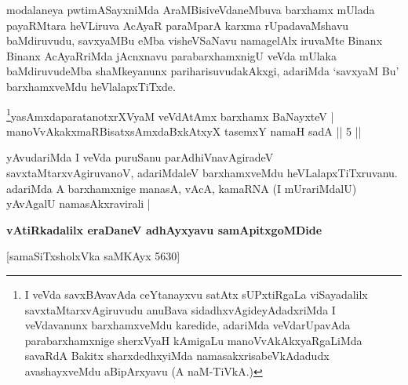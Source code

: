 \begin{artha}
modalaneya pwtimASayxniMda AraMBisiveVdaneMbuva barxhamx mUlada
 payaRMtara heVLiruva AcAyaR paraMparA karxma rUpadavaMshavu
baMdiruvudu, savxyaMBu eMba visheVSaNavu namagelAlx iruvaMte Binanx
Binanx AcAyaRriMda jAcnxnavu parabarxhamxnigU veVda mUlaka
baMdiruvudeMba shaMkeyanunx pariharisuvudakAkxgi, adariMda `savxyaM Bu'
barxhamxveMdu heVlalapxTiTxde.
\end{artha}

\begin{shl}\footnote{I veVda savxBAvavAda ceYtanayxvu satAtx sUPxtiRgaLa
  viSayadalilx savxtaMtarxvAgiruvudu anuBava sidadhxvAgideyAdadxriMda
  I veVdavanunx barxhamxveMdu karedide, adariMda veVdarUpavAda
  parabarxhamxnige sherxVyaH kAmigaLu manoVvAkAkxyaRgaLiMda savaRdA
  Bakitx sharxdedhxyiMda namasakxrisabeVkAdadudx avashayxveMdu
  aBipArxyavu (A naM-TiVkA.)}yasAmxdaparatanotxrXV\s yaM veVdAtAmx barxhamx BaNayxteV |\\
manoVvAkakxmaRBisatxsAmxdaBxkAtxyX tasemxY namaH sadA \hfill || 5 ||
\end{shl}

\begin{artha}
yAvudariMda I veVda puruSanu parAdhiVnavAgiradeV
savxtaMtarxvAgiruvanoV, adariMdaleV barxhamxveMdu
heVLalapxTiTxruvanu. adariMda A barxhamxnige manasA, vAcA, kamaRNA
(I mUrariMdalU) yAvAgalU namasAkxravirali |
\end{artha}

\begin{center}
\textbf{vAtiRkadalilx eraDaneV adhAyxyavu samApitxgoMDide }

\medskip

 [samaSiTxsholxVka saMKAyx 5630]
\end{center}
